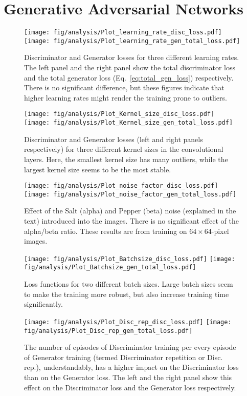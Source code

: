 \section{Generative Adversarial Networks}
\begin{figure*}
	\texttt{[image: fig/analysis/Plot\_learning\_rate\_disc\_loss.pdf]}\hfil
	\texttt{[image: fig/analysis/Plot\_learning\_rate\_gen\_total\_loss.pdf]}
	\caption{Discriminator and Generator losses for three different learning rates. The left panel and the right panel show the total discriminator loss and the total generator loss (Eq.~\ref{eq:total_gen_loss}) respectively.  There is no significant difference, but these figures indicate that higher learning rates might render the training prone to outliers.}
	\label{fig:Plot_learning_rate_loss}
\end{figure*}
\begin{figure*}
	\texttt{[image: fig/analysis/Plot\_Kernel\_size\_disc\_loss.pdf]}
	\texttt{[image: fig/analysis/Plot\_Kernel\_size\_gen\_total\_loss.pdf]}
	\caption{Discriminator and Generator losses (left and right panels respectively) for three different kernel sizes in the convolutional layers. Here, the smallest kernel size has many outliers, while the largest kernel size seems to be the most stable.}
	\label{fig:Plot_kernel_size_loss}
\end{figure*}
\begin{figure*}
	\texttt{[image: fig/analysis/Plot\_noise\_factor\_disc\_loss.pdf]}
	\texttt{[image: fig/analysis/Plot\_noise\_factor\_gen\_total\_loss.pdf]}
	\caption{Effect of the Salt (alpha) and Pepper (beta) noise (explained in the text) introduced into the images.  There is no significant effect of the alpha/beta ratio. These results are from training on $64\times64$-pixel images.}
	\label{fig:Plot_noise_loss}
\end{figure*}
\begin{figure*}
	\texttt{[image: fig/analysis/Plot\_Batchsize\_disc\_loss.pdf]}\hfill
	\texttt{[image: fig/analysis/Plot\_Batchsize\_gen\_total\_loss.pdf]}
	\caption{Loss functions for two different batch sizes. Large batch sizes seem to make the training more robust, but also increase training time significantly. }
	\label{fig:Plot_batchsize_loss}
\end{figure*}
\begin{figure*}
	\texttt{[image: fig/analysis/Plot\_Disc\_rep\_disc\_loss.pdf]}\hfil
	\texttt{[image: fig/analysis/Plot\_Disc\_rep\_gen\_total\_loss.pdf]}
	\caption{The number of episodes of Discriminator training per every episode of Generator training (termed Discriminator repetition or Disc. rep.), understandably, has a higher impact on the Discriminator loss than on the Generator loss. The left and the right panel show this effect on the Discriminator loss and the Generator loss respectively.}
	\label{fig:Plot_discrep_loss}
\end{figure*}
